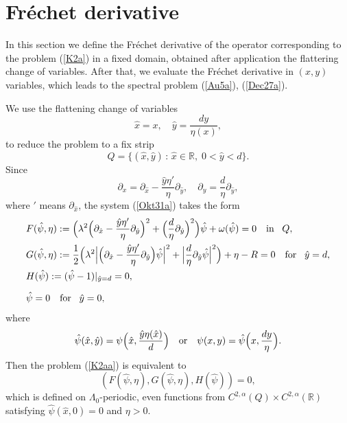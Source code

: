 \documentclass[oneside,a4paper,11pt]{article}
\theoremstyle{thmstyletwo}%
\theoremstyle{thmstylethree}%
\numberwithin{equation}{section}
\begin{document}

\section{Fr\'{e}chet derivative}\label{SecJan16a}

In this section we define the Fr\'{e}chet derivative of the operator corresponding to the problem (\ref{K2a})
in a fixed domain, obtained after application the flattering change of variables. After that, we evaluate the Fr\'{e}chet derivative in $(x,y)$ variables, which leads to the spectral problem (\ref{Au5a}), (\ref{Dec27a}).

We  use the flattening change of variables
$$
\hat{x}=x,\quad\hat{y}=\frac{dy}{\eta(x)},
$$
to reduce the problem to a fix strip
$$
Q=\{(\hat{x},\hat{y})\,:\,\hat{x}\in \mathbb{R},\;0<\hat{y}<d\}.
$$
Since
$$
\partial_{x}=\partial_{\hat{x}}-\frac{\hat{y}\eta'}{\eta}\partial_{\hat{y}},\quad\partial_y=\frac{d}{\eta}\partial_{\hat{y}},
$$
where $'$ means $\partial_{\hat{x}}$,
the system (\ref{Okt31a}) takes the form
\begin{equation}\label{K2aa}
\begin{aligned}
&F(\hat{\psi},\eta):=\Bigl(\lambda^2\Bigl(\partial_{\hat{x}}-\frac{\hat{y}\eta'}{\eta}\partial_{\hat{y}}\Bigr)^2+\Bigl(\frac{d}{\eta}\partial_{\hat{y}}\Bigr)^2\Bigr) \hat{\psi}+\omega(\hat{\psi})=0\quad\mbox{in\!}\quad Q,\\
&G(\hat{\psi},\eta):=\frac{1}{2}\Bigl(\lambda^2\Bigl|\Bigl(\partial_{\hat{x}}-\frac{\hat{y}\eta'}{\eta}\partial_{\hat{y}}\Bigr)\hat{\psi}\Bigr|^2
+\Bigl|\frac{d}{\eta}\partial_{\hat{y}}\hat{\psi}\Bigr|^2\Bigr)+\eta-R=0\quad\mbox{for\!}\quad\hat{y}=d,\\
&H(\hat{\psi}):=(\hat{\psi}-1)|_{\hat{y}=d}=0,\\[2mm]
&\hat{\psi}=0\quad\mbox{for\!}\quad\hat{y}=0,
\end{aligned}
\end{equation}
where
$$
\hat{\psi}({\hat{x}},\hat{y})=\psi\Bigl({\hat{x}},\frac{\hat{y}\eta({\hat{x}})}{d}\Bigr)\quad\mbox{or}\quad\psi(x,y)=\hat{\psi}\Bigl(x,\frac{dy}{\eta}\Bigr).
$$
Then the problem (\ref{K2aa}) is equivalent to
$$
(F(\hat{\psi},\eta),G(\hat{\psi},\eta),H(\hat{\psi}))=0,
$$
which is defined on $\Lambda_0$-periodic, even functions from $C^{2,\alpha}(Q)\times C^{2,\alpha}(\mathbb{R})$  satisfying $\hat{\psi}(\hat{x},0)=0$ and $\eta>0$.
\end{document}
